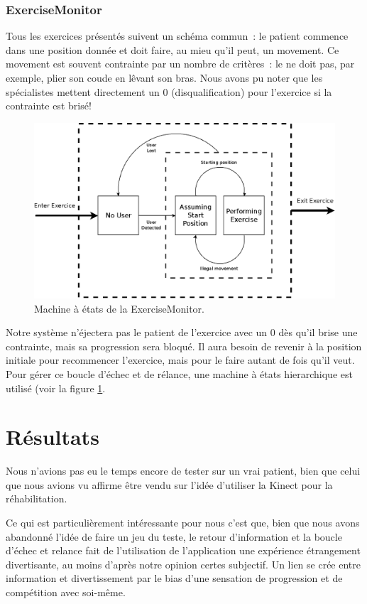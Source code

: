 \documentclass[french,12pt]{report}
\begin{document}
\subsubsection{ExerciseMonitor}

Tous les exercices présentés suivent un schéma commun~: le patient commence dans
une position donnée et doit faire, au mieu qu'il peut, un movement. Ce movement
est souvent contrainte par un nombre de critères~: le ne doit pas, par exemple,
plier son coude en lêvant son bras. Nous avons pu noter que les spécialistes 
mettent directement un 0
(disqualification) pour l'exercice si la contrainte est brisé!

\begin{figure}[h!]
\centering
\includegraphics[width=0.9\linewidth]{images/exercise_monitor}
\caption{Machine à états de la ExerciseMonitor.}
\label{fig:exercise_monitor}
\end{figure}

Notre système n'éjectera pas le patient de l'exercice avec un 0 dès qu'il brise 
une contrainte, mais sa progression sera bloqué. Il aura besoin de revenir à la
position initiale pour recommencer l'exercice, mais pour le faire autant de fois
qu'il veut. Pour gérer ce boucle d'échec et de rélance, une machine à états
hierarchique est utilisé (voir la figure \ref{fig:exercise_monitor}.
		
		
\section{Résultats}\label{resultats}
Nous n'avions pas eu le temps encore de tester sur un vrai patient, bien que 
celui que nous avions vu affirme être vendu sur l'idée d'utiliser la Kinect pour
la réhabilitation.

Ce qui est particulièrement intéressante pour nous c'est que, bien que nous avons
abandonné l'idée de faire un jeu du teste, le retour d'information et la boucle
d'échec et relance fait de l'utilisation de l'application une expérience 
étrangement divertisante, au moins d'après notre opinion certes subjectif. 
Un lien se crée entre information et divertissement 
par le bias d'une sensation de progression et de compétition avec soi-même.
\end{document}
